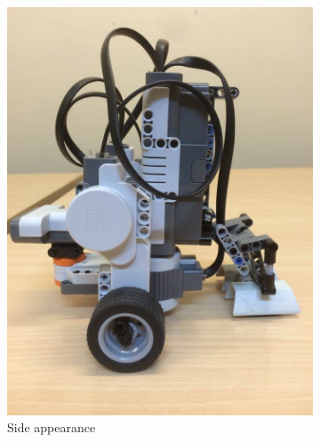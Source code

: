 \documentclass[12pt]{article}
\begin{document}
\begin{figure}[h]
\begin{subfigure}{0.25\textwidth}
  \includegraphics[scale=0.15]{s}
  \caption{Side appearance}
  \end{subfigure}
  \begin{subfigure}{0.25\textwidth}

\end{subfigure}
\end{figure}
\end{document}
